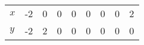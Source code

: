 \documentclass{standalone}
\begin{document}
\begin{tabular}{l|rrrrrrrr}
\toprule
$x$ & -2 & 0 & 0 & 0 & 0 & 0 & 0 & 2 \\
$y$ & -2 & 2 & 0 & 0 & 0 & 0 & 0 & 0 \\
\bottomrule
\end{tabular}
\end{document}
